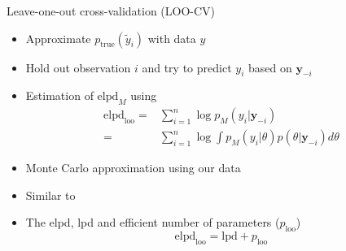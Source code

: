 \documentclass[10pt]{beamer}
\begin{document}
\begin{frame}{Leave-one-out cross-validation (LOO-CV)}

\begin{itemize}
\item Approximate $p_\text{true}(\tilde{y}_i)$ with data $y$
\pause
\item Hold out observation $i$ and try to predict $y_i$ based on $\mathbf{y}_{-i}$
\item Estimation of $\text{elpd}_M$ using 
\small
\begin{align*}
\text{elpd}_\text{loo} = & \sum^n_{i=1} \log p_M(y_i|\mathbf{y}_{-i}) \\
 = & \sum^n_{i=1} \log \int p_M(y_i|\theta) p(\theta|\mathbf{y}_{-i})d\theta
\end{align*}
\pause
\item {} Monte Carlo approximation using our data
\item Similar to 
\pause
\item The elpd, lpd and efficient number of parameters ($p_\text{loo}$)
\[
\text{elpd}_\text{loo} = \text{lpd} + p_\text{loo}
\]
\end{itemize}
\end{frame}
\end{document}
